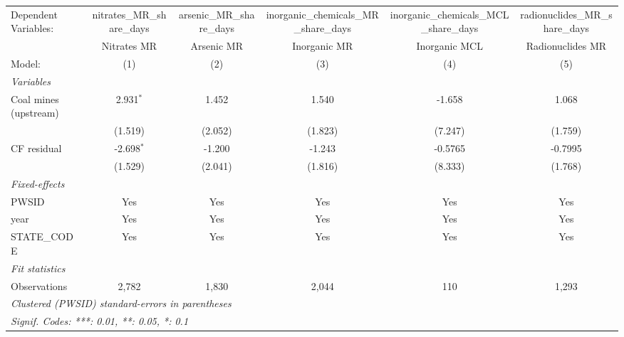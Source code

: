 
\begingroup
\centering
\begin{tabular}{lccccc}
   \tabularnewline \midrule \midrule
   Dependent Variables:  & nitrates\_MR\_share\_days    & arsenic\_MR\_share\_days    & inorganic\_chemicals\_MR\_share\_days     & inorganic\_chemicals\_MCL\_share\_days     & radionuclides\_MR\_share\_days\\     
                         & Nitrates MR                  & Arsenic MR                  & Inorganic MR                              & Inorganic MCL                              & Radionuclides MR \\   
   Model:                & (1)                          & (2)                         & (3)                                       & (4)                                        & (5)\\  
   \midrule
   \emph{Variables}\\
   Coal mines (upstream) & 2.931$^{*}$                  & 1.452                       & 1.540                                     & -1.658                                     & 1.068\\   
                         & (1.519)                      & (2.052)                     & (1.823)                                   & (7.247)                                    & (1.759)\\   
   CF residual           & -2.698$^{*}$                 & -1.200                      & -1.243                                    & -0.5765                                    & -0.7995\\   
                         & (1.529)                      & (2.041)                     & (1.816)                                   & (8.333)                                    & (1.768)\\   
   \midrule
   \emph{Fixed-effects}\\
   PWSID                 & Yes                          & Yes                         & Yes                                       & Yes                                        & Yes\\  
   year                  & Yes                          & Yes                         & Yes                                       & Yes                                        & Yes\\  
   STATE\_CODE           & Yes                          & Yes                         & Yes                                       & Yes                                        & Yes\\  
   \midrule
   \emph{Fit statistics}\\
   Observations          & 2,782                        & 1,830                       & 2,044                                     & 110                                        & 1,293\\  
   \midrule \midrule
   \multicolumn{6}{l}{\emph{Clustered (PWSID) standard-errors in parentheses}}\\
   \multicolumn{6}{l}{\emph{Signif. Codes: ***: 0.01, **: 0.05, *: 0.1}}\\
\end{tabular}
 

